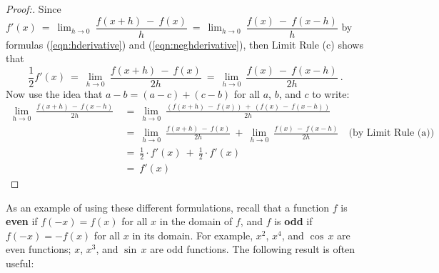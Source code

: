 \begin{proofbar}\vspace{-3mm}\begin{proof}[Proof:]
Since $f'(x) ~=~ \displaystyle\lim_{h \to 0} ~\dfrac{f(x + h) ~-~ f(x)}
{h} ~=~ \displaystyle\lim_{h \to 0} ~\dfrac{f(x) ~-~ f(x-h)}{h}$ by formulas
(\ref{eqn:hderivative}) and (\ref{eqn:neghderivative}), then Limit Rule (c) shows
that
\begin{displaymath}
 \frac{1}{2}f'(x) ~=~ \lim_{h \to 0} ~\frac{f(x + h) ~-~ f(x)}
 {2h} ~=~ \lim_{h \to 0} ~\frac{f(x) ~-~ f(x-h)}{2h} ~.
\end{displaymath}
Now use the idea that $a - b = (a - c) + (c - b)$ for all $a$, $b$,
and $c$ to write:
\begin{align*}
 \lim_{h \to 0} ~\frac{f(x+h) ~-~ f(x-h)}{2h}
 ~&=~ \lim_{h \to 0} ~\frac{\left(f(x+h) ~-~ f(x)\right) ~+~ \left(f(x) ~-~
  f(x-h)\right)}{2h}\\[6pt]
 &=~ \lim_{h \to 0} ~\frac{f(x+h) ~-~ f(x)}{2h} ~+~
     \lim_{h \to 0} ~\frac{f(x) ~-~ f(x-h)}{2h}
     \quad\text{(by Limit Rule (a))}\\[6pt]
 &=~ \frac{1}{2} \cdot f'(x) ~+~ \frac{1}{2} \cdot f'(x)\\[6pt]
 &=~ f'(x)
\end{align*}
\vspace{-3mm}
\end{proof}\end{proofbar}
\newpage
As an example of using these different formulations, recall that a function $f$
is \textbf{even} if $f(-x) = f(x)$ for
all $x$ in the domain of $f$, and $f$ is \textbf{odd} if $f(-x) = -f(x)$ for all $x$ in its domain.
For example, $x^2$, $x^4$, and $\cos\,x$ are even functions; $x$, $x^3$, and
$\sin\,x$ are odd functions. The following result is often useful:


